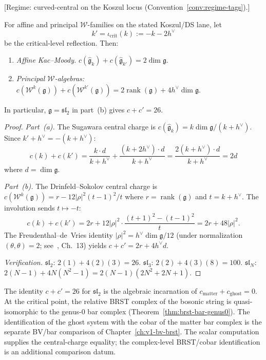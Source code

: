 \begin{theorem}\label{thm:central-charge-complementarity}
\ClaimStatusProvedHere
{}
\textup{[Regime: curved-central on the Koszul locus
\textup{(}Convention~\textup{\ref{conv:regime-tags})}.]}

For affine and principal \(\mathcal W\)-families on the stated
Koszul/DS lane, let
\[
k'=\iota_{\mathrm{crit}}(k):=-k-2h^\vee
\]
be the critical-level reflection. Then:
\begin{enumerate}
\item[\textup{(a)}] \emph{Affine Kac--Moody.}
 $c(\widehat{\mathfrak{g}}_k) + c(\widehat{\mathfrak{g}}_{k'})
 = 2 \dim \mathfrak{g}$.
\item[\textup{(b)}] \emph{Principal $\mathcal{W}$-algebras:}
 $c(\mathcal{W}^k(\mathfrak{g})) + c(\mathcal{W}^{k'}(\mathfrak{g}))
 = 2\operatorname{rank}(\mathfrak{g}) + 4h^\vee \dim \mathfrak{g}$.
\end{enumerate}
In particular, $\mathfrak{g} = \mathfrak{sl}_2$ in
part~\textup{(b)} gives $c + c' = 26$.
\end{theorem}

\begin{proof}
\emph{Part~(a).} The Sugawara central charge is
$c(\widehat{\mathfrak{g}}_k) = k \dim\mathfrak{g}/(k + h^\vee)$.
Since $k' + h^\vee = -(k + h^\vee)$:
\[
c(k) + c(k') = \frac{k \cdot d}{k+h^\vee}
+ \frac{(k+2h^\vee) \cdot d}{k+h^\vee}
= \frac{2(k + h^\vee) \cdot d}{k+h^\vee} = 2d
\]
where $d = \dim\mathfrak{g}$.

\emph{Part~(b).} The Drinfeld--Sokolov central charge is
$c(\mathcal{W}^k(\mathfrak{g})) = r - 12|\rho|^2 (t-1)^2/t$
where $r = \operatorname{rank}(\mathfrak{g})$ and
$t = k + h^\vee$.
The involution sends $t \mapsto -t$:
\[
c(k) + c(k') = 2r + 12|\rho|^2 \cdot
\frac{(t+1)^2 - (t-1)^2}{t}
= 2r + 48|\rho|^2.
\]
The Freudenthal--de~Vries identity
$|\rho|^2 = h^\vee \dim\mathfrak{g}/12$
(under normalization $(\theta, \theta) = 2$;
see~\cite{Kac}, Ch.~13)
yields $c + c' = 2r + 4h^\vee d$.

\emph{Verification.}
$\mathfrak{sl}_2$: $2(1) + 4(2)(3) = 26$.
$\mathfrak{sl}_3$: $2(2) + 4(3)(8) = 100$.
$\mathfrak{sl}_N$:
$2(N{-}1) + 4N(N^2{-}1) = 2(N{-}1)(2N^2{+}2N{+}1)$.
\end{proof}

\begin{remark}\label{rem:bosonic-string-26}
The identity $c + c' = 26$ for $\mathfrak{sl}_2$ is the algebraic
incarnation of $c_{\mathrm{matter}} + c_{\mathrm{ghost}} = 0$.
At the critical point, the relative BRST complex of the bosonic string
is quasi-isomorphic to the genus-$0$ bar complex
\textup{(}Theorem~\ref{thm:brst-bar-genus0}\textup{)}. The identification
of the ghost system with the cobar of the matter bar complex
is the separate BV/bar comparison of Chapter~\ref{ch:v1-bv-brst}.
The scalar computation supplies the central-charge equality; the
complex-level BRST/cobar identification is an additional comparison
datum.
\end{remark}

